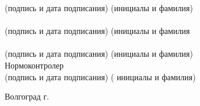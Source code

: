 \begin{titlepage}
\begin{flushleft}
            \vspace{-0.2cm}\hspace{0.5cm}\footnotesize(подпись и дата подписания)\hspace{2cm}
            (инициалы и фамилия)\\
        \hspace{0.2cm}\underline{\hspace{5cm}}\hspace{0.5cm}\underline{\hspace{6cm}}\\
            \vspace{-0.2cm}\hspace{0.5cm}\footnotesize(подпись и дата подписания)\hspace{2cm}
            (инициалы и фамилия\\
        \hspace{0.2cm}\underline{\hspace{5cm}}\hspace{0.5cm}\underline{\hspace{6cm}}\\
            \vspace{-0.2cm}\hspace{0.5cm}\footnotesize(подпись и дата подписания)\hspace{2cm}
            (инициалы и фамилия)\normalsize\\
        \vspace{2cm}
        Нормоконтролер \underline{\hspace{5cm}}\hspace{0.5cm}\underline{\hspace{7cm}}\\
            \vspace{-0.2cm}\hspace{4.2cm}\footnotesize(подпись и дата подписания)\hspace{2cm}
        (   инициалы и фамилия)\normalsize\\
    \end{flushleft}
    \vspace{\fill}
    \begin{center}
        Волгоград \the\year г.
    \end{center}
\end{titlepage}
